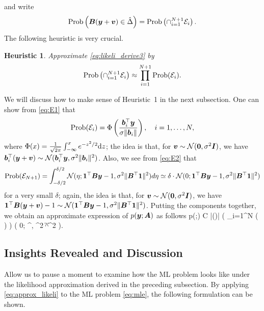 \documentclass[10pt,twocolumn,twoside]{IEEEtran}
\newtheorem{Heuristic}{Heuristic}
\begin{document}
and write
\[
{\rm Prob}\left(  {\bm B}({\bm y}+{\bm v}) \in \hat{\Delta} \right) = {\rm Prob}\left(  \cap_{i=1}^{N+1} \mathcal{E}_i \right).
\]
The following heuristic is very crucial.
\begin{Heuristic}
	Approximate \eqref{eq:likeli_derive3} by
	\[
	{\rm Prob}\left(  \cap_{i=1}^{N+1} \mathcal{E}_i \right) \approx \prod_{i=1}^{N+1} {\rm Prob}( \mathcal{E}_i ).
	\]
\end{Heuristic}
We will discuss how to make sense of Heuristic~1 in the next subsection.
One can show from \eqref{eq:E1} that
\[
{\rm Prob}( \mathcal{E}_i ) = \Phi\left(  \frac{{\bm b}_i^\top {\bm y}}{\sigma \| {\bm b}_i \|} \right),
\quad i=1,\ldots,N,
\]
where $\Phi(x) = \frac{1}{\sqrt{2\pi}} \int_{-\infty}^x e^{-z^2/2} {\rm d}z$; the idea is that, for $ {\bm v} \sim \mathcal{N}({\bm 0},\sigma^2 {\bm I}) $, we have $ {\bm b}_i^\top ({\bm y} + {\bm v}) \sim \mathcal{N}({\bm b}_i^\top {\bm y},\sigma^2 \|{\bm b}_i\|^2) $.
Also, we see from \eqref{eq:E2} that
\[
{\rm Prob}( \mathcal{E}_{N+1} ) = \int_{-\delta/2}^{\delta/2}\mathcal{N}( \eta; {\bm 1}^\top {\bm B} {\bm y} -1, \sigma^2 \| {\bm B}^\top {\bm 1} \|^2 )d\eta \simeq \delta \cdot \mathcal{N}( 0; {\bm 1}^\top {\bm B} {\bm y} -1, \sigma^2 \| {\bm B}^\top {\bm 1} \|^2 )
\]
for a very small $ \delta $; again, the idea is that, for $ {\bm v} \sim \mathcal{N}({\bm 0},\sigma^2 {\bm I}) $, we have $ {\bm 1}^\top {\bm B}({\bm y} + {\bm v}) - 1 \sim \mathcal{N}({\bm 1}^\top {\bm B} {\bm y} -1, \sigma^2 \| {\bm B}^\top {\bm 1} \|^2 ) $.
Putting the components together, we obtain an approximate expression of $p({\bm y};{\bm A})$ as follows
\beq \label{eq:approx_likeli}
p(\by;\bA) \approx \delta C |\det(\bB)| \cdot \left( \prod_{i=1}^N  \Phi\left(   \right) \right) \cdot  \setN( 0; \bone^\top \bB {}, \sigma^2 \| \bB^\top \bone \|^2 ).
\eeq


\subsection{Insights Revealed and Discussion}

Allow us to pause a moment to examine how the ML problem looks like under the likelihood approximation derived in the preceding subsection.
By applying \eqref{eq:approx_likeli} to the ML problem \eqref{eq:mle}, the following formulation can be shown.

\medskip

\begin{center}
	\noindent {}
\end{center}
\end{document}
